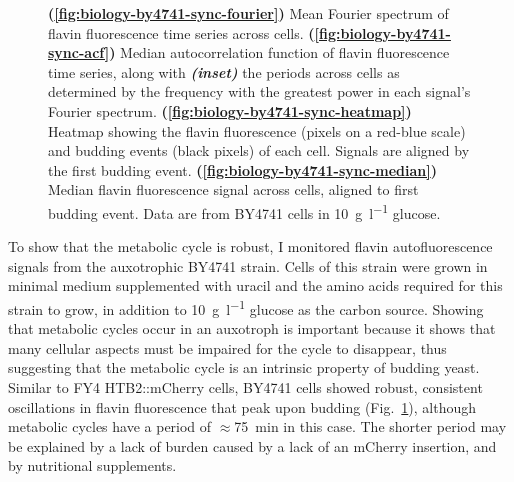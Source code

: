 \begin{figure}
  \caption[
    Mean Fourier spectrum of flavin fluorescence time series across cells.
    Median autocorrelation function of flavin fluorescence time series, along with the periods across cells.
    Heatmap showing the flavin fluorescence and budding events of each cell.
    Median flavin fluorescence signal across cells, aligned to first budding event.
    Data are from BY4741 cells in \SI{10}{\gram~\litre^{-1}} glucose.
  ]{
    \textbf{(\ref{fig:biology-by4741-sync-fourier})} Mean Fourier spectrum of flavin fluorescence time series across cells.
    \textbf{(\ref{fig:biology-by4741-sync-acf})} Median autocorrelation function of flavin fluorescence time series, along with \textit{\textbf{(inset)}} the periods across cells as determined by the frequency with the greatest power in each signal's Fourier spectrum.
    \textbf{(\ref{fig:biology-by4741-sync-heatmap})}
    Heatmap showing the flavin fluorescence (pixels on a red-blue scale) and budding events (black pixels) of each cell.
    Signals are aligned by the first budding event.
    \textbf{(\ref{fig:biology-by4741-sync-median})}
    Median flavin fluorescence signal across cells, aligned to first budding event.
    Data are from BY4741 cells in \SI{10}{\gram~\litre^{-1}} glucose.
  }
  \label{fig:biology-by4741-sync}
\end{figure}

To show that the metabolic cycle is robust,
I monitored flavin autofluorescence signals from the auxotrophic BY4741 strain.
Cells of this strain were grown in minimal medium supplemented with uracil and the amino acids required for this strain to grow, in addition to \SI{10}{\gram~\litre^{-1}} glucose as the carbon source.
Showing that metabolic cycles occur in an auxotroph is important because it shows that many cellular aspects must be impaired for the cycle to disappear, thus suggesting that the metabolic cycle is an intrinsic property of budding yeast.
Similar to FY4 HTB2::mCherry cells, BY4741 cells showed robust, consistent oscillations in flavin fluorescence that peak upon budding (Fig.\ \ref{fig:biology-by4741-sync}), although metabolic cycles have a period of $\approx$\SI{75}{\minute} in this case.
The shorter period may be explained by a lack of burden caused by a lack of an mCherry insertion, and by nutritional supplements.


